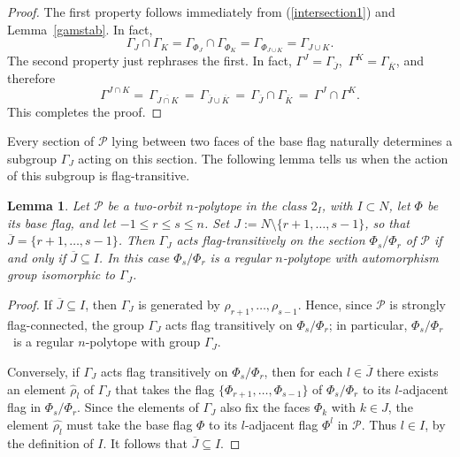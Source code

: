 \documentclass[12pt]{article}
\renewcommand{\bar}{\overline}
\renewcommand{\>}{\rangle}
\renewcommand{\leq}{\leqslant}
\newtheorem{lemma}[theorem]{Lemma}
\theoremstyle{definition}\newtheorem{definition}{Definition}[section]
\begin{document}
\begin{proof}
The first property follows immediately from (\ref{intersection1}) and Lemma~\ref{gamstab}. In fact, 
\[ \Gamma_{J} \cap \Gamma_{K} = \Gamma_{\Phi_J} \cap \Gamma_{\Phi_K}
= \Gamma_{\Phi_{J\cup K}}= \Gamma_{J\cup K}.\]
The second property just rephrases the first. In fact, $\Gamma^{J}=\Gamma_{\bar{J}}$,\  $\Gamma^{K}=\Gamma_{\bar{K}}$, and therefore
\[\Gamma^{J\cap K}=\,\Gamma_{\bar{J\cap K}}\,=\,\Gamma_{\bar{J}\cup \bar{K}}
\,=\, \Gamma_{\bar{J}}\cap\Gamma_{\bar{K}} \,=\, \Gamma^{J}\cap\Gamma^{K}.\]
This completes the proof.
\end{proof}
\smallskip

Every section of $\mathcal{P}$ lying between two faces of the base flag naturally determines a subgroup $\Gamma_J$ acting on this section. The following lemma tells us when the action of this subgroup is flag-transitive.

\begin{lemma}
\label{oneorbitsections}
Let $\mathcal{P}$ be a two-orbit $n$-polytope in the class $2_I$, with $I \subset N$, let $\Phi$ be its base flag, and let $-1 \leq r \leq s \leq n$. Set $J:=N \setminus \{r+1, \dots, s-1\}$, so that $\bar{J}= \{r+1,\dots, s-1\}$. Then $\Gamma_J$ acts flag-transitively on the section $\Phi_s / \Phi_r$ of $\mathcal{P}$ if and only if $\bar{J} \subseteq I$. In this case $\Phi_s / \Phi_r$ is a regular $n$-polytope with automorphism group isomorphic to $\Gamma_J$.
\end{lemma}

\begin{proof}
If $\bar{J} \subseteq I$, then $\Gamma_J$ is generated by $\rho_{r+1}, \dots, \rho_{s-1}$. Hence, since $\mathcal{P}$ is strongly flag-connected, the group $\Gamma_J$ acts flag transitively on $\Phi_s / \Phi_r$; in particular, $\Phi_s / \Phi_r$~is a regular $n$-polytope with group $\Gamma_J$.

Conversely, if $\Gamma_J$ acts flag transitively on $\Phi_s/\Phi_r$, then for each $l\in\bar{J}$ there exists an element $\widehat{\rho}_l$ of $\Gamma_J$ that takes the flag $\{\Phi_{r+1}, \dots, \Phi_{s-1}\}$ of $\Phi_s / \Phi_r$ to its $l$-adjacent flag in $\Phi_s / \Phi_r$. Since the elements of $\Gamma_J$ also fix the faces $\Phi_k$ with $k\in J$, the element $\widehat{\rho_l}$ must take the base flag $\Phi$ to its $l$-adjacent flag $\Phi^l$ in $\mathcal{P}$. Thus $l\in I$, by the definition of $I$. It follows that $\bar{J} \subseteq I$. 
\end{proof}
\smallskip
\end{document}
